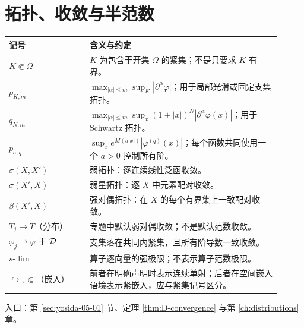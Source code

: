 \section*{拓扑、收敛与半范数}
\begin{longtable}{p{0.27\linewidth}p{0.64\linewidth}}
\toprule 记号 & 含义与约定\\\midrule\endhead
$K\Subset\Omega$ & $K$ 为包含于开集 $\Omega$ 的紧集；不是只要求 $K$ 有界。\\
$p_{K,m}$ & $\max_{|\alpha|\le m}\sup_K|\partial^\alpha\varphi|$；用于局部光滑或固定支集拓扑。\\
$q_{N,m}$ & $\max_{|\alpha|\le m}\sup_x(1+|x|)^N|\partial^\alpha\varphi(x)|$；用于 Schwartz 拓扑。\\
$p_{a,q}$ & $\sup_xe^{M(a|x|)}|\varphi^{(q)}(x)|$；每个函数共同使用一个 $a>0$ 控制所有阶。\\
$\sigma(X,X')$ & 弱拓扑：逐连续线性泛函收敛。\\
$\sigma(X',X)$ & 弱星拓扑：逐 $X$ 中元素配对收敛。\\
$\beta(X',X)$ & 强对偶拓扑：在 $X$ 的每个有界集上一致配对收敛。\\
$T_j\to T$（分布） & 专题中默认弱对偶收敛；不是默认范数收敛。\\
$\varphi_j\to\varphi$ 于 $\mathcal{D}$ & 支集落在共同内紧集，且所有阶导数一致收敛。\\
$s\text{-}\lim$ & 算子逐向量的强极限；不表示算子范数极限。\\
$\hookrightarrow,\Subset$（嵌入） & 前者在明确声明时表示连续单射；后者在空间嵌入语境表示紧嵌入，应与紧集记号区分。\\
\bottomrule\end{longtable}
入口：第 \ref{sec:yosida-05-01} 节、定理 \ref{thm:D-convergence} 与第 \ref{ch:distributions} 章。


